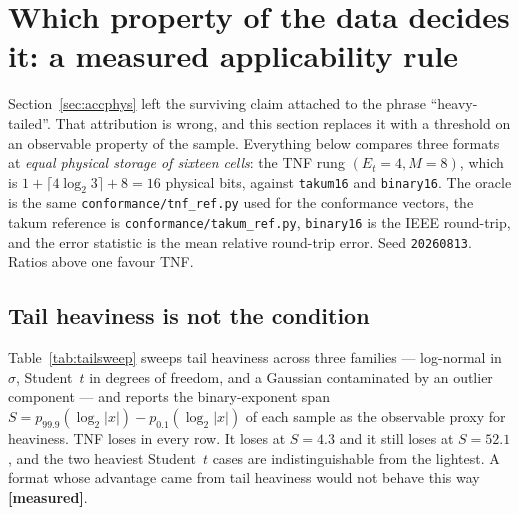 \section{Which property of the data decides it: a measured applicability
rule}\label{sec:window}

Section~\ref{sec:accphys} left the surviving claim attached to the phrase
``heavy-tailed''. That attribution is wrong, and this section replaces it with a
threshold on an observable property of the sample. Everything below compares three
formats at \emph{equal physical storage of sixteen cells}: the TNF rung
$(E_t{=}4,M{=}8)$, which is $1+\lceil 4\log_2 3\rceil+8=16$ physical bits, against
\texttt{takum16} and \texttt{binary16}. The oracle is the same
\texttt{conformance/tnf\_ref.py} used for the conformance vectors, the takum
reference is \texttt{conformance/\allowbreak takum\_\allowbreak ref.py}, \texttt{binary16} is the IEEE
round-trip, and the error statistic is the mean relative round-trip error. Seed
\texttt{20260813}. Ratios above one favour TNF.

\subsection{Tail heaviness is not the condition}

Table~\ref{tab:tailsweep} sweeps tail heaviness across three families --- log-normal
in $\sigma$, Student~$t$ in degrees of freedom, and a Gaussian contaminated by an
outlier component --- and reports the binary-exponent span
$S=p_{99.9}(\log_2|x|)-p_{0.1}(\log_2|x|)$ of each sample as the observable proxy
for heaviness. TNF loses in every row. It loses at $S=4.3$ and it still loses at
$S=52.1$, and the two heaviest Student~$t$ cases are indistinguishable from the
lightest. A format whose advantage came from tail heaviness would not behave this
way \textbf{[measured]}.

